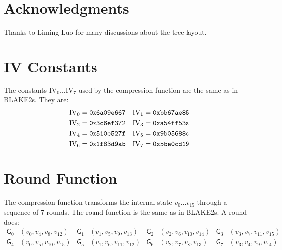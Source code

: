 \documentclass[11pt,notitlepage,a4paper]{article}
\newcommand{\GG}{\mathsf{G}}
\newcommand{\IV}{\text{IV}}
\begin{document}
\section{Acknowledgments}\label{sec:acknowledgments}

Thanks to Liming Luo for many discussions about the tree layout.





\begin{appendices}

\section{IV Constants}\label{sec:ivconstants}

    The constants $\IV_0 \ldots \IV_7$ used by the compression function are the
    same as in BLAKE2s. They are:
\begin{align*}
    \IV_0 &= \text{\texttt{0x6a09e667}} &
    \IV_1 &= \text{\texttt{0xbb67ae85}} \\
    \IV_2 &= \text{\texttt{0x3c6ef372}} &
    \IV_3 &= \text{\texttt{0xa54ff53a}} \\
    \IV_4 &= \text{\texttt{0x510e527f}} &
    \IV_5 &= \text{\texttt{0x9b05688c}} \\
    \IV_6 &= \text{\texttt{0x1f83d9ab}} &
    \IV_7 &= \text{\texttt{0x5be0cd19}}
\end{align*}

\section{Round Function}\label{sec:roundfn}

    The compression function transforms the internal state $v_{0} \ldots
    v_{15}$ through a sequence of 7 rounds. The round function is the same as
    in BLAKE2s. A round does:
\begin{align*}
    \GG_{0}&(v_{0}, v_{4}, v_{8}, v_{12}) &
    \GG_{1}&(v_{1}, v_{5}, v_{9}, v_{13}) &
    \GG_{2}&(v_{2}, v_{6}, v_{10}, v_{14}) &
    \GG_{3}&(v_{3}, v_{7}, v_{11}, v_{15}) \\
    \GG_{4}&(v_{0}, v_{5}, v_{10}, v_{15}) &
    \GG_{5}&(v_{1}, v_{6}, v_{11}, v_{12}) &
    \GG_{6}&(v_{2}, v_{7}, v_{8}, v_{13}) &
    \GG_{7}&(v_{3}, v_{4}, v_{9}, v_{14})
\end{align*}


\end{appendices}
\end{document}

